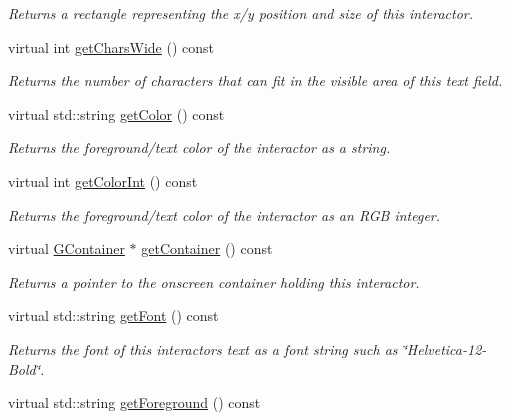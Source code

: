 \begin{DoxyCompactItemize}
\begin{DoxyCompactList}\small\item\em Returns a rectangle representing the x/y position and size of this interactor. \end{DoxyCompactList}\item 
virtual int \mbox{\hyperlink{classsgl_1_1GTextField_acccdf98a090bca28752d04519a8b1a28}{get\+Chars\+Wide}} () const
\begin{DoxyCompactList}\small\item\em Returns the number of characters that can fit in the visible area of this text field. \end{DoxyCompactList}\item 
virtual std\+::string \mbox{\hyperlink{classsgl_1_1GInteractor_aa061dfa488c31e18549d64363c1d0e34}{get\+Color}} () const
\begin{DoxyCompactList}\small\item\em Returns the foreground/text color of the interactor as a string. \end{DoxyCompactList}\item 
virtual int \mbox{\hyperlink{classsgl_1_1GInteractor_a9635c7af766cdc3417f346683fa0e6c1}{get\+Color\+Int}} () const
\begin{DoxyCompactList}\small\item\em Returns the foreground/text color of the interactor as an R\+GB integer. \end{DoxyCompactList}\item 
virtual \mbox{\hyperlink{classsgl_1_1GContainer}{G\+Container}} $\ast$ \mbox{\hyperlink{classsgl_1_1GInteractor_a7a6e317c29d61030929b4cd2d1c00fe7}{get\+Container}} () const
\begin{DoxyCompactList}\small\item\em Returns a pointer to the onscreen container holding this interactor. \end{DoxyCompactList}\item 
virtual std\+::string \mbox{\hyperlink{classsgl_1_1GInteractor_a894a5502900794eeb27d084c21f1d77d}{get\+Font}} () const
\begin{DoxyCompactList}\small\item\em Returns the font of this interactor\textquotesingle{}s text as a font string such as \char`\"{}\+Helvetica-\/12-\/\+Bold\char`\"{}. \end{DoxyCompactList}\item 
virtual std\+::string \mbox{\hyperlink{classsgl_1_1GInteractor_a4fa2d8b0192a3a5b4af4bbfe71194d03}{get\+Foreground}} () const

\end{DoxyCompactItemize}
